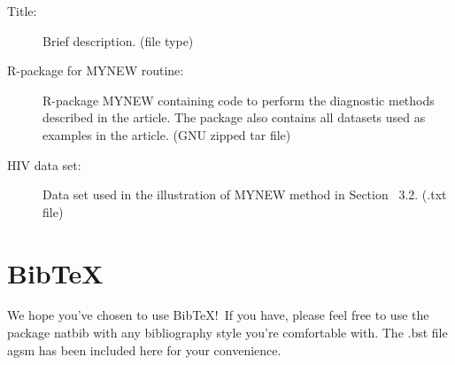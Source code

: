 \documentclass[12pt]{article}
\begin{document}
\begin{description}

\item[Title:] Brief description. (file type)

\item[R-package for  MYNEW routine:] R-package MYNEW containing code to perform the diagnostic methods described in the article. The package also contains all datasets used as examples in the article. (GNU zipped tar file)

\item[HIV data set:] Data set used in the illustration of MYNEW method in Section~ 3.2. (.txt file)

\end{description}

\section{BibTeX}

We hope you've chosen to use BibTeX!\ If you have, please feel free to use the package natbib with any bibliography style you're comfortable with. The .bst file agsm has been included here for your convenience. 

\printbibliography
\end{document}
